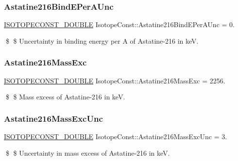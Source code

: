 \subsubsection{\texorpdfstring{Astatine216\+Bind\+E\+Per\+A\+Unc}{Astatine216BindEPerAUnc}}
{\footnotesize\ttfamily \mbox{\hyperlink{group___isotope_const-_macros_ga8f45a7272ce02c0b4c65c44636ed719a}{I\+S\+O\+T\+O\+P\+E\+C\+O\+N\+S\+T\+\_\+\+D\+O\+U\+B\+LE}} Isotope\+Const\+::\+Astatine216\+Bind\+E\+Per\+A\+Unc = 0.}

\$ \$ Uncertainty in binding energy per A of Astatine-\/216 in keV. \mbox{\label{group___isotope_const-_astatine-_at216_ga6169ce03e203a38dea4c0fbcdb423ca9}} 
\subsubsection{\texorpdfstring{Astatine216\+Mass\+Exc}{Astatine216MassExc}}
{\footnotesize\ttfamily \mbox{\hyperlink{group___isotope_const-_macros_ga8f45a7272ce02c0b4c65c44636ed719a}{I\+S\+O\+T\+O\+P\+E\+C\+O\+N\+S\+T\+\_\+\+D\+O\+U\+B\+LE}} Isotope\+Const\+::\+Astatine216\+Mass\+Exc = 2256.}

\$ \$ Mass excess of Astatine-\/216 in keV. \mbox{\label{group___isotope_const-_astatine-_at216_ga004dc53c3a03933fbcb9d508d16d9486}} 
\subsubsection{\texorpdfstring{Astatine216\+Mass\+Exc\+Unc}{Astatine216MassExcUnc}}
{\footnotesize\ttfamily \mbox{\hyperlink{group___isotope_const-_macros_ga8f45a7272ce02c0b4c65c44636ed719a}{I\+S\+O\+T\+O\+P\+E\+C\+O\+N\+S\+T\+\_\+\+D\+O\+U\+B\+LE}} Isotope\+Const\+::\+Astatine216\+Mass\+Exc\+Unc = 3.}

\$ \$ Uncertainty in mass excess of Astatine-\/216 in keV. \mbox{\label{group___isotope_const-_astatine-_at216_gaaac3f224a2f17eccb2ad097a7cb9ec36}} 
